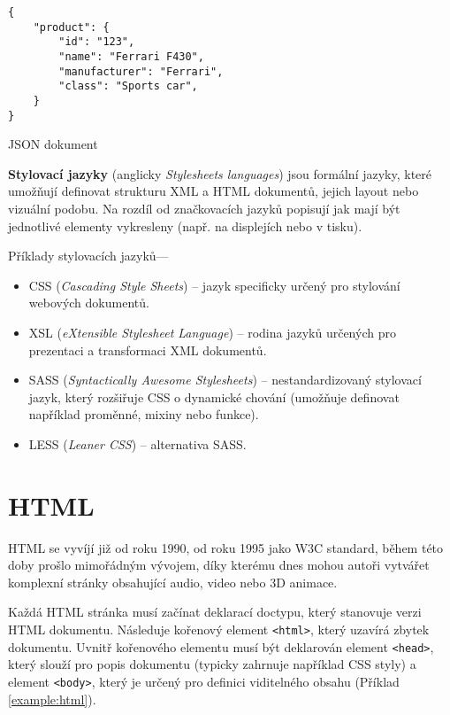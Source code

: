 \begin{example}
    \centering
    \begin{lstlisting}
{
    "product": {
        "id": "123",
        "name": "Ferrari F430",
        "manufacturer": "Ferrari",
        "class": "Sports car",
    }
}
    \end{lstlisting}
    \caption{JSON dokument}
    \label{example:json}
\end{example}

\textbf{Stylovací jazyky} (anglicky \textit{Stylesheets languages}) jsou formální jazyky, které umožňují definovat strukturu XML a HTML dokumentů, jejich layout nebo vizuální podobu. Na rozdíl od značkovacích jazyků popisují jak mají být jednotlivé elementy vykresleny (např. na displejích nebo v tisku).

Příklady stylovacích jazyků---

\begin{itemize}
    \item CSS (\textit{Cascading Style Sheets}) -- jazyk specificky určený pro stylování webových dokumentů.
    \item XSL (\textit{eXtensible Stylesheet Language}) -- rodina jazyků určených pro prezentaci a transformaci XML dokumentů.
    \item SASS (\textit{Syntactically Awesome Stylesheets}) -- nestandardizovaný stylovací jazyk, který rozšiřuje CSS o dynamické chování (umožňuje definovat například proměnné, mixiny nebo funkce).
    \item LESS (\textit{Leaner CSS}) -- alternativa SASS.
\end{itemize}

\section{HTML}
\label{sec:html}

HTML se vyvíjí již od roku 1990, od roku 1995 jako W3C standard, během této doby prošlo mimořádným vývojem, díky kterému dnes mohou autoři vytvářet komplexní stránky obsahující audio, video nebo 3D animace.

Každá HTML stránka musí začínat deklarací doctypu, který stanovuje verzi HTML dokumentu. Následuje kořenový element \texttt{<html>}, který uzavírá zbytek dokumentu. Uvnitř kořenového elementu musí být deklarován element \texttt{<head>}, který slouží pro popis dokumentu (typicky zahrnuje například CSS styly) a element \texttt{<body>}, který je určený pro definici viditelného obsahu (Příklad \ref{example:html}).

